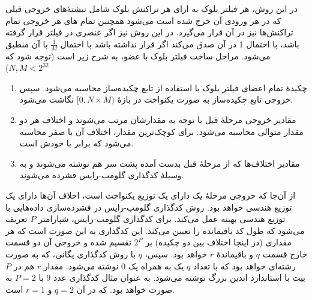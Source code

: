 در این روش، هر فیلتر بلوک به ازای هر تراکنش‌ بلوک شامل نبشتهٔ‌های خروجی قبلی که در هر ورودی‌ آن خرج شده است می‌شود همچنین تمام های هر خروجی تمام تراکنش‌ها نیز در آن قرار می‌گیرد. در این روش نیز اگر عنصری در فیلتر قرار گرفته باشد، با احتمال 1 در آن صدق می‌کند اگر قرار نداشته باشد با احتمال $\frac{1}{M}$ با آن منطبق می‌شود. مراحل ساخت فیلتر بلوک با  عضو، به شرح زیر است (توجه شود که
$N,M < 2^{32}$)
\begin{enumerate}
	\item {%
	چکیدهٔ تمام اعضای فیلتر بلوک با استفاده از تابع چکیده‌ساز  محاسبه می‌شود. سپس خروجی تابع چکیده‌ساز به صورت یکنواخت در بازهٔ 
	$[0, N\times M)$
	نگاشت می‌شود. 
}

\item {%
	مقادیر خروجی مرحلهٔ قبل با توجه به مقدارشان مرتب می‌شوند و اختلاف هر دو مقدار متوالی محاسبه می‌شود. برای کوچک‌ترین مقدار، اختلاف آن با صفر محاسبه می‌شود که برابر با خودش است.
 }

\item {%
مقادیر اختلاف‌ها که از مرحلهٔ قبل بدست آمده پشت سر هم نوشته می‌شوند و به وسیلهٔ کدگذاری گلومب-رایس فشرده می‌شوند.
}

\end{enumerate}

از آن‌جا که خروجی مرحلهٔ یک دارای یک توزیع یکنواخت است،‌ اخلاف آن‌ها دارای یک توزیع هندسی خواهد بود. روش کدگذاری گلومب-رایس در فشرده‌سازی داده‌هایی با توزیع هندسی بهینه عمل می‌کند\cite{Osuntokun2-2017}. برای کدگذاری گلومب-رایس، شپارامتر $P$ تعریف می‌شود که طول کد باقیمانده را تعیین می‌کند. این کد‌گذاری به این صورت است که هر مقداری (در اینجا اختلاف بین دو چکیده) بر $2^P$ تقسیم شده و خروجی آن دو قسمت خارج قسمت $q$ و باقیماندهٔ $r$ خواهد بود. سپس، $q$ با روش کدگذاری یگانی، که به صورت رشته‌ای خواهد بود که با تعداد $q$ یک به همراه یک $0$ نوشته می‌شود. مقدار $r$ هم در $P$ بیت با استاندارد اندین بزرگ نوشته می‌شود. به عنوان مثال کدگذاری عدد $9$ با $P=2$  به صورت
 خواهد بود. که در آن $q=2$ و $r=1$ است.
 
